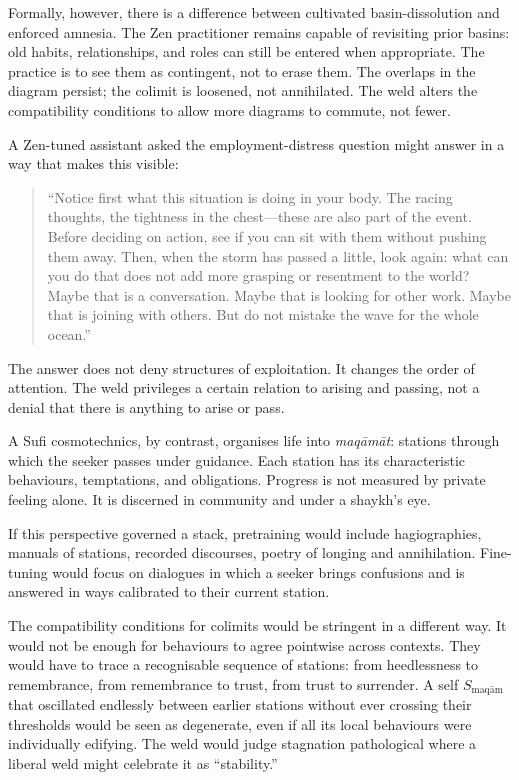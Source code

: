 \documentclass[12pt,a4paper]{article}
\begin{document}
Formally, however, there is a difference between cultivated basin-dissolution and enforced amnesia. The Zen practitioner remains capable of revisiting prior basins: old habits, relationships, and roles can still be entered when appropriate. The practice is to see them as contingent, not to erase them. The overlaps in the diagram persist; the colimit is loosened, not annihilated. The weld alters the compatibility conditions to allow more diagrams to commute, not fewer.

A Zen-tuned assistant asked the employment-distress question might answer in a way that makes this visible:

\begin{quote}
``Notice first what this situation is doing in your body. The racing thoughts, the tightness in the chest---these are also part of the event. Before deciding on action, see if you can sit with them without pushing them away. Then, when the storm has passed a little, look again: what can you do that does not add more grasping or resentment to the world? Maybe that is a conversation. Maybe that is looking for other work. Maybe that is joining with others. But do not mistake the wave for the whole ocean.''
\end{quote}

The answer does not deny structures of exploitation. It changes the order of attention. The weld privileges a certain relation to arising and passing, not a denial that there is anything to arise or pass.

A Sufi cosmotechnics, by contrast, organises life into \emph{maq\=am\=at}: stations through which the seeker passes under guidance. Each station has its characteristic behaviours, temptations, and obligations. Progress is not measured by private feeling alone. It is discerned in community and under a shaykh's eye.

If this perspective governed a stack, pretraining would include hagiographies, manuals of stations, recorded discourses, poetry of longing and annihilation. Fine-tuning would focus on dialogues in which a seeker brings confusions and is answered in ways calibrated to their current station.

The compatibility conditions for colimits would be stringent in a different way. It would not be enough for behaviours to agree pointwise across contexts. They would have to trace a recognisable sequence of stations: from heedlessness to remembrance, from remembrance to trust, from trust to surrender. A self $S_{\text{maq\=am}}$ that oscillated endlessly between earlier stations without ever crossing their thresholds would be seen as degenerate, even if all its local behaviours were individually edifying. The weld would judge stagnation pathological where a liberal weld might celebrate it as ``stability.''
\end{document}
